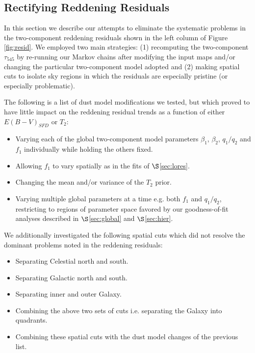 \documentclass{emulateapj}
\begin{document}
\subsection{Rectifying Reddening Residuals}
In this section we describe our attempts to eliminate the systematic
problems in the two-component reddening residuals shown in the left column
of Figure \ref{fig:resid}. We employed two main strategies: (1) recomputing
the two-component $\tau_{545}$ by re-running our Markov chains after modifying 
the input maps and/or changing the particular two-component model adopted and
(2) making spatial cuts to isolate sky regions in which the 
residuals are especially pristine (or especially problematic).

The following is a list of dust model modifications we tested, but which
proved to have little impact on the reddening residual trends as a function 
of either $E(B-V)_{SFD}$ or $T_2$:

\begin{itemize}
\item Varying each of the global two-component model parameters $\beta_1$, 
$\beta_2$, $q_1/q_2$ and $f_1$ individually while holding the others fixed.
\vspace{-3mm}
\item Allowing $f_1$ to vary spatially as in the fits of $\S$\ref{sec:lores}.
\vspace{-2mm}
\item Changing the mean and/or variance of the $T_2$ prior.
\vspace{-6mm}
\item Varying multiple global parameters at a time e.g. both $f_1$ and 
$q_1/q_2$, restricting to regions of parameter space favored by our 
goodness-of-fit analyses described in $\S$\ref{sec:global} and 
$\S$\ref{sec:hier}.
\end{itemize}

We additionally investigated the following spatial cuts which did not resolve 
the dominant problems noted in the reddening residuals:
\begin{itemize}
\item Separating Celestial north and south.
\vspace{-3mm}
\item Separating Galactic north and south.
\vspace{-3mm}
\item Separating inner and outer Galaxy.
\vspace{-3mm}
\item Combining the above two sets of cuts i.e. separating the Galaxy into
quadrants. 
\vspace{-3mm}
\item Combining these spatial cuts with the dust model changes of the previous
list.
\end{itemize}
\end{document}
